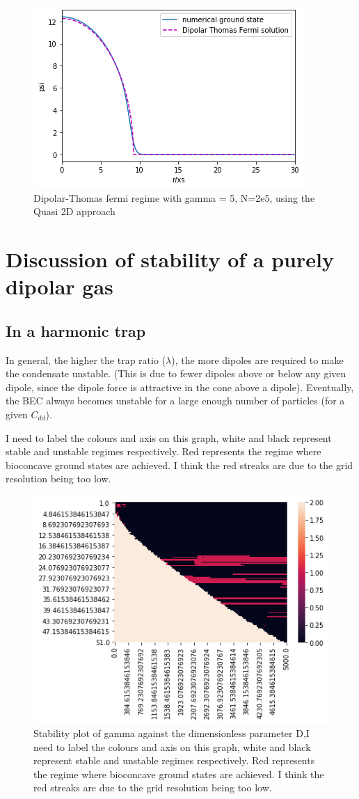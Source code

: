 \documentclass[10pt]{article}
\begin{document}
\begin{multicols}{2}
\begin{figure}[H]
\centering
\includegraphics[width=0.6\linewidth]{Dipolar Thomas Fermi Quasi 2D Hankel gamma = 80 No = 2e4}
\caption{Dipolar-Thomas fermi regime with gamma = 5, N=2e5, using the Quasi 2D approach}
\end{figure}

\section{Discussion of stability of a purely dipolar gas}

\subsection{In a harmonic trap}

In general, the higher the trap ratio ($\lambda$), the more dipoles are required to make the condensate unstable. (This is due to fewer dipoles above or below any given dipole, since the dipole force is attractive in the cone above a dipole). Eventually, the BEC always becomes unstable for a large enough number of particles (for a given $C_{dd}$).

I need to label the colours and axis on this graph, white and black represent stable and unstable regimes respectively. Red represents the regime where bioconcave ground states are achieved. I think the red streaks are due to the grid resolution being too low.

\begin{figure}[H]
\centering
\includegraphics[width=0.6\linewidth]{stability plot dt =0.005}
\caption{Stability plot of gamma against the dimensionless parameter D,I need to label the colours and axis on this graph, white and black represent stable and unstable regimes respectively. Red represents the regime where bioconcave ground states are achieved. I think the red streaks are due to the grid resolution being too low.}
\end{figure}


\end{multicols}
\end{document}
